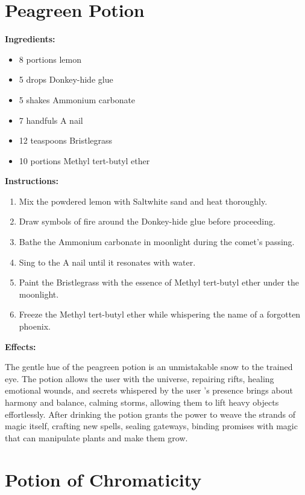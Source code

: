 \documentclass{article}
\begin{document}
\newpage
\section*{Peagreen Potion}

\textbf{Ingredients:}

\begin{itemize}
  \item 8 portions lemon
  \item 5 drops Donkey-hide glue
  \item 5 shakes Ammonium carbonate
  \item 7 handfuls A nail
  \item 12 teaspoons Bristlegrass
  \item 10 portions Methyl tert-butyl ether
\end{itemize}

\textbf{Instructions:}

\begin{enumerate}
  \item Mix the powdered lemon with Saltwhite sand and heat thoroughly.
  \item Draw symbols of fire around the Donkey-hide glue before proceeding.
  \item Bathe the Ammonium carbonate in moonlight during the comet’s passing.
  \item Sing to the A nail until it resonates with water.
  \item Paint the Bristlegrass with the essence of Methyl tert-butyl ether under the moonlight.
  \item Freeze the Methyl tert-butyl ether while whispering the name of a forgotten phoenix.
\end{enumerate}

\textbf{Effects:}

The gentle hue of the peagreen potion is an unmistakable snow to the trained eye. The potion allows the user with the universe, repairing rifts, healing emotional wounds, and secrets whispered by the user 's presence brings about harmony and balance, calming storms, allowing them to lift heavy objects effortlessly. After drinking the potion grants the power to weave the strands of magic itself, crafting new spells, sealing gateways, binding promises with magic that can manipulate plants and make them grow.

\newpage
\section*{Potion of Chromaticity}
\end{document}
